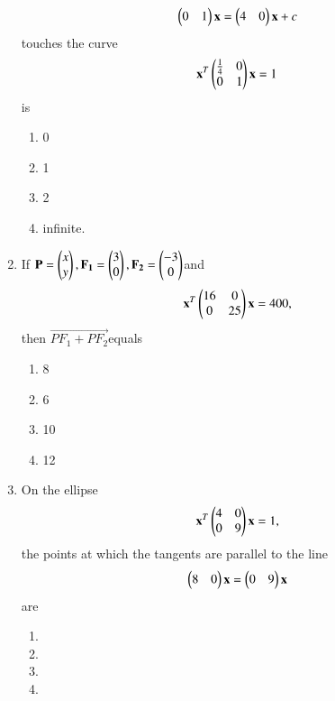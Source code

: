 \documentclass[journal,12pt,twocolumn]{IEEEtran}
\begin{document}
\begin{enumerate}[label=\arabic*]
    \begin{align}
    \begin{pmatrix}0&1\end{pmatrix}\mathbf{x}=\begin{pmatrix}4&0\end{pmatrix}\mathbf{x}+c
    \end{align} touches the curve
    \begin{align}
    \mathbf{x}^T\begin{pmatrix}\frac{1}{4}& 0 \\0 & 1\end{pmatrix} \mathbf{x}=1
    \end{align}is 
    \begin{enumerate}
    \item 0
    \item 1
    \item 2
    \item infinite.
    \end{enumerate}
    \item If $\mathbf{P}=\begin{pmatrix}x\\y\end{pmatrix}, \mathbf{F_1}=\begin{pmatrix}3\\0\end{pmatrix}, \mathbf{F_2}=\begin{pmatrix}-3\\0\end{pmatrix}$and
    \begin{align}
    \mathbf{x}^T\begin{pmatrix}16& 0 \\0 & 25\end{pmatrix} \mathbf{x}=400,\end{align}then $\vec{PF_1+PF_2} $equals 
    \begin{enumerate}
    \item 8
    \item 6
    \item 10
    \item 12
    \end{enumerate}
    \item On the ellipse
    \begin{align} 
    \mathbf{x}^T\begin{pmatrix}4& 0 \\0 & 9\end{pmatrix} \mathbf{x}=1,
    \end{align} the points at which the tangents are parallel to the line 
    \begin{align}
    \begin{pmatrix}8&0\end{pmatrix}\mathbf{x}=\begin{pmatrix}0&9\end{pmatrix}\mathbf{x}
    \end{align} are 
    \begin{enumerate}
    \item {}
    \item {}
    \item {}
    \item {}
    \end{enumerate}

\end{enumerate}
\end{document}
